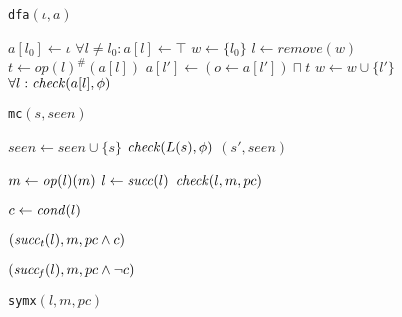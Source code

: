 \begin{figure}[t]
\noindent\begin{minipage}[t]{0.32\textwidth}
\begin{algorithm}[H]
\renewcommand{\algorithmicindent}{0.6em}
\caption{{\tt dfa}$(\iota,a)$}
\label{alg-dfa}
\begin{algorithmic}
 \STATE $a[l_0] \gets \iota$
 \STATE $\forall l \not= l_0 : a[l] \gets \top$
 \STATE $w \gets \{l_0\}$
   \STATE $l \gets remove(w)$
   \STATE $t \gets {op(l)}^{\#}(a[l])$
     \STATE $a[l'] \gets (o \gets a[l']) \sqcap t$
       \STATE $w \gets w \cup \{l'\}$
     \ENDIF
   \ENDFOR
 \ENDWHILE
 \STATE $\forall l : \mathit{check}(a[l],\phi)$
\end{algorithmic}
\end{algorithm}
\end{minipage}%
\hfill
\begin{minipage}[t]{0.29\textwidth}
\begin{algorithm}[H]
\renewcommand{\algorithmicindent}{0.6em}
\caption{{\tt mc}$(s,seen)$}
\label{alg-mc}
\begin{algorithmic}
   \STATE $seen \gets seen \cup \{s\}$
   \STATE $\mathit{check}(L(s),\phi)$
     $(s',seen)$
   \ENDFOR
 \ENDIF
\end{algorithmic}
\end{algorithm}
\end{minipage}%
\hfill
\begin{minipage}[t]{0.34\textwidth}
\begin{algorithm}[H]
\renewcommand{\algorithmicindent}{0.6em}
\caption{{\tt symx}$(l,m,pc)$}
\label{alg-symexe}
\begin{algorithmic}
 \RETURN
 \ENDIF
   \STATE $m \gets \mathit{op}(l)(m)$
   \STATE $l \gets \mathit{succ}(l)$
   \STATE $\mathit{check}(l,m,pc)$
 \ENDWHILE

 \STATE $c \gets \mathit{cond}(l)$

   $(\mathit{succ_t}(l), m, pc \wedge c)$
 \ENDIF

   $(\mathit{succ_f}(l), m, pc \wedge \neg c)$
 \ENDIF
\end{algorithmic}
\end{algorithm}
\end{minipage}
\end{figure}

